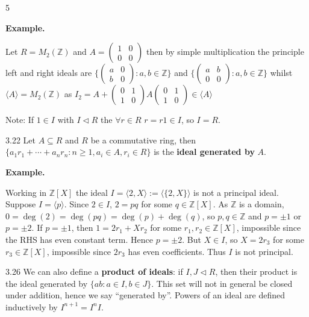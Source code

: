 \documentclass[8pt]{extarticle}
\newenvironment{example}{%
  \par\noindent
  \textbf{Example.}\ \normalfont
  \ignorespaces
}{%
  \par
}
\begin{document}
\begin{multicols*}{5}
        \begin{example}
            Let \(R=M_2(\mathbb{Z})\) and \(A=\begin{pmatrix}1&0\\0&0\end{pmatrix}\) then by simple multiplication the principle left and right ideals are \(\{\begin{pmatrix}
                a&0\\b&0
            \end{pmatrix}:a,b\in \mathbb{Z}\}\) and \(\{\begin{pmatrix}
                a&b\\0&0
            \end{pmatrix}:a,b\in \mathbb{Z}\}\) whilst \(\langle A\rangle=M_2(\mathbb{Z})\) as \(I_2=A+\begin{pmatrix}0&1\\1&0\end{pmatrix}A\begin{pmatrix}0&1\\1&0\end{pmatrix}\in\langle A\rangle\)

            {\footnotesize Note: If \(1\in I\) with \(I\lhd R\) the \(\forall r \in R\) \(r=r1\in I\), so \(I=R\).}
        \end{example}

        \begin{definition}{3.22}
            Let \(A\subseteq R\) and \(R\) be a commutative ring, then \(\{a_1r_1+\cdots+a_nr_n:n\ge1,a_i\in A,r_i\in R\}\) is the \textbf{ideal generated by} \(A\).
        \end{definition}

        \begin{example}
            Working in \(\mathbb{Z}[X]\) the ideal \(I=\langle 2,X\rangle:=\langle \{2,X\}\rangle\) is not a principal ideal. Suppose \(I=\langle p\rangle\). Since \(2\in I\), \(2=pq\) for some \(q\in\mathbb{Z}[X]\). As \(\mathbb{Z}\) is a domain, \(0=\deg(2)=\deg(pq)=\deg(p)+\deg(q)\), so \(p,q\in\mathbb{Z}\) and \(p=\pm1\) or \(p=\pm2\). If \(p=\pm1\), then \(1=2r_1+Xr_2\) for some \(r_1,r_2\in\mathbb{Z}[X]\), impossible since the RHS has even constant term. Hence \(p=\pm2\). But \(X\in I\), so \(X=2r_3\) for some \(r_3\in\mathbb{Z}[X]\), impossible since \(2r_3\) has even coefficients. Thus \(I\) is not principal.
        \end{example}

        \begin{definition}{3.26}
            We can also define a \textbf{product of ideals}: if \(I,J\lhd R\), then their product is the ideal generated by \(\{ab:a\in I,b\in J\}\). This set will not in general be closed under addition, hence we say ``generated by''. Powers of an ideal are defined inductively by \(I^{n+1}=I^nI\).
        \end{definition}


\end{multicols*}
\end{document}
